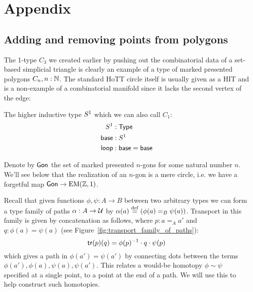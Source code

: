 \section{Appendix}
\subsection{Adding and removing points from polygons}
\label{sec:polygons}

The 1-type \( C_3 \) we created earlier by pushing out the combinatorial data of a set-based simplicial triangle is clearly an example of a type of marked presented polygons \( C_n, n:\mathbb{N} \). The standard HoTT circle itself is usually given as a HIT and is a non-example of a combinatorial manifold since it lacks the second vertex of the edge:

\begin{mydef}
The higher inductive type \( S^1 \) which we can also call \( C_1 \):
\begin{align*}
S^1 &:\mathsf{Type} \\
\mathsf{base}&:S^1 \\
\mathsf{loop}&:\mathsf{base}=\mathsf{base}
\end{align*}
\end{mydef}

Denote by \( \mathsf{Gon} \) the set of marked presented \( n \)-gons for some natural number \( n \). We'll see below that the realization of an \( n \)-gon is a mere circle, i.e. we have a forgetful map \( \mathsf{Gon}\to \mathrm{EM}(\mathbb{Z},1) \).

Recall that given functions \( \phi,\psi:A\to B \) between two arbitrary types we can form a type family of paths \( \alpha:A\to\mathcal{U} \) by \( \alpha(a)\stackrel{\mathrm{def}}{=}(\phi(a)=_B\psi(a)) \). Transport in this family is given by concatenation as follows, where \( p:a=_A a' \) and \( q:\phi(a)=\psi(a) \) (see Figure~\ref{fig:transport_family_of_paths}):
\[ 
\mathsf{tr}(p)(q) = \phi(p)^{-1}\cdot q\cdot \psi(p)
\]
which gives a path in \( \phi(a')=\psi(a') \) by connecting dots between the terms \( \phi(a'), \phi(a), \psi(a), \psi(a') \). This relates a would-be homotopy \( \phi\sim\psi \) specified at a single point, to a point at the end of a path. We will use this to help construct such homotopies.


